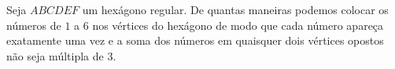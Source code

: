 Seja $ABCDEF$ um hexágono regular.
De quantas maneiras podemos colocar os números de $1$ a $6$ nos vértices do hexágono de modo que cada número apareça exatamente uma vez e a soma dos números em quaisquer dois vértices opostos não seja múltipla de $3$.
